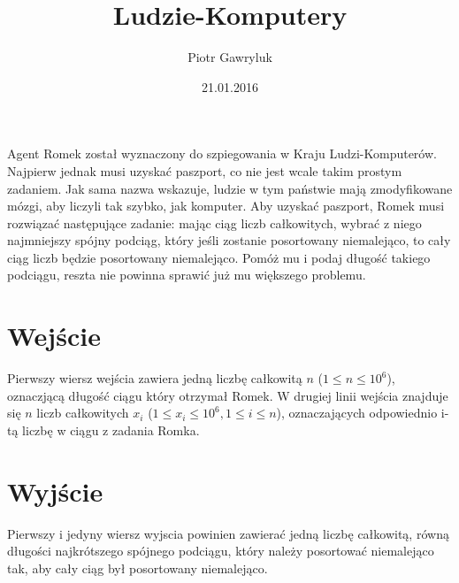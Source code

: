 \documentclass[zad,zawodnik,utf8]{sinol}
\title{Ludzie-Komputery}
\author{Piotr Gawryluk} %
\date{21.01.2016}
\begin{document}
  \begin{tasktext}%

Agent Romek został wyznaczony do szpiegowania w Kraju Ludzi-Komputerów. Najpierw jednak musi uzyskać paszport, co nie jest wcale takim prostym zadaniem. Jak sama nazwa wskazuje, ludzie w tym państwie mają zmodyfikowane mózgi, aby liczyli tak szybko, jak komputer.
Aby uzyskać paszport, Romek musi rozwiązać następujące zadanie: mając ciąg liczb całkowitych, wybrać z niego najmniejszy spójny podciąg, który jeśli zostanie posortowany niemalejąco, to cały ciąg liczb będzie posortowany niemalejąco. Pomóż mu i podaj długość takiego podciągu, reszta nie powinna sprawić już mu większego problemu.
  
\section{Wejście}

Pierwszy wiersz wejścia zawiera jedną liczbę całkowitą $n$ ($1 \leq n \leq 10^{6}$), 
oznaczjącą długość ciągu który otrzymał Romek. W drugiej linii wejścia znajduje się $n$ liczb całkowitych 
$x_{i}$ ($ 1 \leq x_{i} \leq 10^{6}, 1 \leq i \leq n $), oznaczających odpowiednio i-tą liczbę w ciągu z zadania Romka.

  \section{Wyjście}

Pierwszy i jedyny wiersz wyjscia powinien zawierać jedną liczbę całkowitą, równą długości najkrótszego spójnego podciągu, który należy posortować niemalejąco tak, aby cały ciąg był posortowany niemalejąco.

     \makecompactexample

  \end{tasktext}
\end{document}
